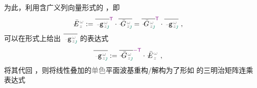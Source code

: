 为此，利用含广义列向量形式的 ，即
\begin{align} \label{eq:vec-amp_eigenmode-matrix}
	\xint{\mathcolor{gray}{-}}{30}{\bar{E}}^{\;\!\mathcolor{gray}{\omega}}_{\;\! \mathcolor{gray}{z}} &:= \overline{\xint{\begin{smallmatrix} ~ \\ {}^{}_{\mathcolor{gray}{-}} \\ ~ \end{smallmatrix}}{09}{\mathtt{g}}^{\;\!\mathcolor{gray}{\omega}}_{\;\! \mathcolor{gray}{z} \textcolor{PineGreen}{\jmath}}}^{\mathsf{\textcolor{Plum}{T}}} \cdot \overline{\xint{\mathcolor{gray}{-}}{20}{\bar{G}}^{\;\!\mathcolor{gray}{\omega}}_{\;\! \mathcolor{gray}{z} \textcolor{PineGreen}{\jmath}}} = \overline{\xint{\mathcolor{gray}{-}}{20}{\bar{G}}^{\;\!\mathcolor{gray}{\omega}}_{\;\! \mathcolor{gray}{z} \textcolor{PineGreen}{\jmath}}}^{\mathsf{\textcolor{Plum}{T}}} \cdot \overline{\xint{\begin{smallmatrix} ~ \\ {}^{}_{\mathcolor{gray}{-}} \\ ~ \end{smallmatrix}}{09}{\mathtt{g}}^{\;\!\mathcolor{gray}{\omega}}_{\;\! \mathcolor{gray}{z} \textcolor{PineGreen}{\jmath}}} ~,
\end{align}
可以在形式上给出 $\overline{\xint{\begin{smallmatrix} ~ \\ {}^{}_{\mathcolor{gray}{-}} \\ ~ \end{smallmatrix}}{09}{\mathtt{g}}^{\;\!\mathcolor{gray}{\omega}}_{\;\! \mathcolor{gray}{z} \textcolor{PineGreen}{\jmath}}}$ 的表达式
\begin{align} \label{eq:amp_vec}
	\overline{\xint{\begin{smallmatrix} ~ \\ {}^{}_{\mathcolor{gray}{-}} \\ ~ \end{smallmatrix}}{09}{\mathtt{g}}^{\;\!\mathcolor{gray}{\omega}}_{\;\! \mathcolor{gray}{z} \textcolor{PineGreen}{\jmath}}} &:= \overline{\xint{\mathcolor{gray}{-}}{20}{\bar{G}}^{\;\!\mathcolor{gray}{\omega}}_{\;\! \mathcolor{gray}{z} \textcolor{PineGreen}{\jmath}}}^{\textcolor{Plum}{-\mathsf{T}}} \cdot \xint{\mathcolor{gray}{-}}{30}{\bar{E}}^{\;\!\mathcolor{gray}{\omega}}_{\;\! \mathcolor{gray}{z}} ~,
\end{align}
将其代回 ，则将\textcolor{PineGreen}{线性叠加的\textcolor{gray}{单色}平面波基}重构/解构为了形如  的三明治矩阵连乘表达式
